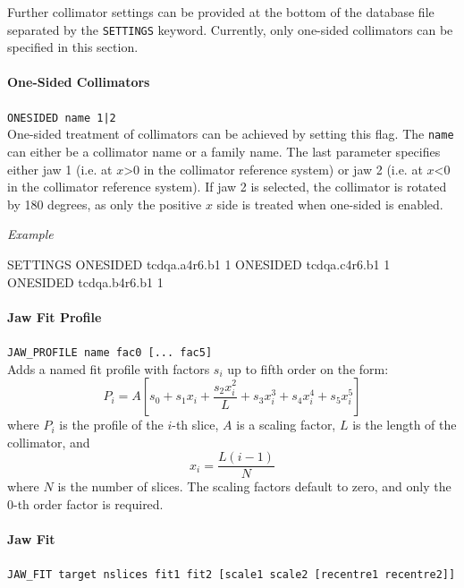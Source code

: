 Further collimator settings can be provided at the bottom of the database file separated by the \texttt{SETTINGS} keyword.
Currently, only one-sided collimators can be specified in this section.

\paragraph{One-Sided Collimators} \texttt{ONESIDED name 1|2}\\

One-sided treatment of collimators can be achieved by setting this flag.
The \texttt{name} can either be a collimator name or a family name.
The last parameter specifies either jaw 1 (i.e. at $x$>0 in the collimator reference system) or jaw 2 (i.e. at $x$<0 in the collimator reference system).
If jaw 2 is selected, the collimator is rotated by 180 degrees, as only the positive $x$ side is treated when one-sided is enabled.

\bigskip
\noindent\textit{Example}
\begin{cverbatim}
SETTINGS
ONESIDED tcdqa.a4r6.b1    1
ONESIDED tcdqa.c4r6.b1    1
ONESIDED tcdqa.b4r6.b1    1
\end{cverbatim}

\paragraph{Jaw Fit Profile} \texttt{JAW\_PROFILE name fac0 [... fac5]}\\

Adds a named fit profile with factors $s_i$ up to fifth order on the form:
\begin{equation}
    P_i = A\left[s_0 + s_1 x_i + \frac{s_2 x_i^2}{L} + s_3 x_i^3 + s_4 x_i^4 + s_5 x_i^5\right]
\end{equation}
where $P_i$ is the profile of the $i$-th slice, $A$ is a scaling factor, $L$ is the length of the collimator, and
\begin{equation}
    x_i = \frac{L(i-1)}{N}
\end{equation}
where $N$ is the number of slices.
The scaling factors default to zero, and only the $0$-th order factor is required.

\paragraph{Jaw Fit} \texttt{JAW\_FIT target nslices fit1 fit2 [scale1 scale2 [recentre1 recentre2]]}\\

